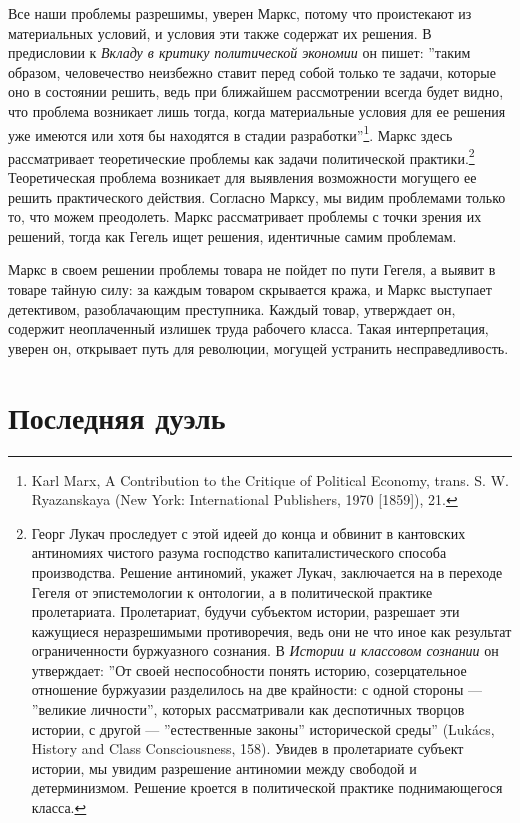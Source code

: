 \documentclass[12pt]{book}
\begin{document}
Все наши проблемы разрешимы, уверен Маркс, потому что проистекают из материальных условий, и условия эти также содержат их решения. В предисловии к \textit{Вкладу в критику политической экономии} он пишет: ''таким образом, человечество неизбежно ставит перед собой только те задачи, которые оно в состоянии решить, ведь при ближайшем рассмотрении всегда будет видно, что проблема возникает лишь тогда, когда материальные условия для ее решения уже имеются или хотя бы находятся в стадии разработки''\footnote{ Karl Marx, A Contribution to the Critique of Political Economy, trans. S. W. Ryazanskaya (New York: International Publishers, 1970 [1859]), 21.}. Маркс здесь рассматривает теоретические проблемы как задачи политической практики.\footnote{Георг Лукач проследует с этой идеей до конца и обвинит в кантовских антиномиях чистого разума господство капиталистического способа производства. Решение антиномий, укажет Лукач, заключается на в переходе Гегеля от эпистемологии к онтологии, а в политической практике пролетариата. Пролетариат, будучи субъектом истории, разрешает эти кажущиеся неразрешимыми противоречия, ведь они не что иное как результат ограниченности буржуазного сознания. В \textit{Истории и классовом сознании} он утверждает: ''От своей неспособности понять историю, созерцательное отношение буржуазии разделилось на две крайности: с одной стороны --- ''великие личности'', которых рассматривали как деспотичных творцов истории, с другой --- ''естественные законы'' исторической среды'' (Lukács, History and Class Consciousness, 158). Увидев в пролетариате субъект истории, мы увидим разрешение антиномии между свободой и детерминизмом. Решение кроется в политической практике поднимающегося класса.} Теоретическая проблема возникает для выявления возможности могущего ее решить практического действия. Согласно Марксу, мы видим проблемами только то, что можем преодолеть. Маркс рассматривает проблемы с точки зрения их решений, тогда как Гегель ищет решения, идентичные самим проблемам.

Маркс в своем решении проблемы товара не пойдет по пути Гегеля, а выявит в товаре тайную силу: за каждым товаром скрывается кража, и Маркс выступает детективом, разоблачающим преступника. Каждый товар, утверждает он, содержит неоплаченный излишек труда рабочего класса. Такая интерпретация, уверен он, открывает путь для революции, могущей устранить несправедливость.

\section{Последняя дуэль}
\end{document}
